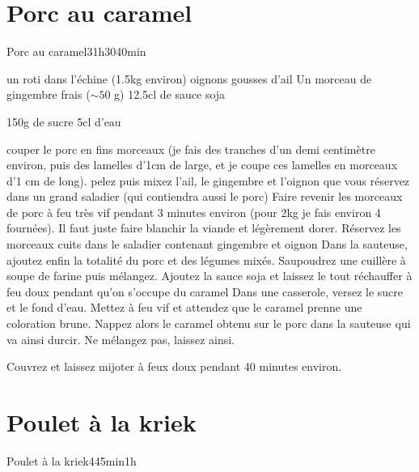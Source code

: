 {\section{Porc au caramel}
\begin{recette}{Porc au caramel}{3}{1h30}{40min}
\begin{ingredients}
\ingredient un roti dans l'échine (1.5kg environ)
 oignons
 gousses d'ail
\ingredient Un morceau de gingembre frais ($\sim 50$ g)
\ingredient 12.5cl de sauce soja

\ingredient 150g de sucre
\ingredient 5cl d'eau
\end{ingredients}

\begin{preparation}
\etape couper le porc en fins morceaux (je fais des tranches d'un demi centimètre environ, puis des lamelles d'1cm de large, et
je coupe ces lamelles en morceaux d'1 cm de long).
\etape pelez puis mixez l'ail, le gingembre et l'oignon que vous réservez dans un grand saladier (qui contiendra aussi le porc)
\etape Faire revenir les morceaux de porc à feu très vif pendant 3 minutes environ (pour 2kg je fais environ 4 fournées). Il
faut juste faire blanchir la viande et légèrement dorer. Réservez les morceaux cuits dans le saladier contenant gingembre et
oignon
\etape Dans la sauteuse, ajoutez enfin la totalité du porc et des légumes mixés. 
\etape Saupoudrez une cuillère à soupe de farine puis mélangez. 
\etape Ajoutez la sauce soja et laissez le tout réchauffer à feu doux pendant qu'on s'occupe du caramel
\etape Dans une casserole, versez le sucre et le fond d'eau. Mettez à feu vif et attendez que le caramel prenne une coloration
brune.
\etape Nappez alors le caramel obtenu sur le porc dans la sauteuse qui va ainsi durcir. Ne mélangez pas, laissez ainsi.
\end{preparation}

\begin{cuisson}
Couvrez et laissez mijoter à feux doux pendant 40 minutes environ.
\end{cuisson}
\end{recette}


\section{Poulet à la kriek}
\begin{recette}{Poulet à la kriek}{4}{45min}{1h}



\end{recette}}
